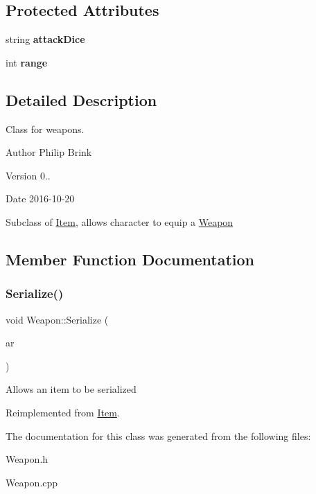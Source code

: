 \subsection*{Protected Attributes}
\begin{DoxyCompactItemize}
\item 
\hypertarget{class_weapon_a034430020bc2fefd021253b49014c334}{}\label{class_weapon_a034430020bc2fefd021253b49014c334} 
string {\bfseries attack\+Dice}
\item 
\hypertarget{class_weapon_a13cc71a89d0cf076f58a040767682478}{}\label{class_weapon_a13cc71a89d0cf076f58a040767682478} 
int {\bfseries range}
\end{DoxyCompactItemize}


\subsection{Detailed Description}
Class for weapons. 

\begin{DoxyAuthor}{Author}
Philip Brink 
\end{DoxyAuthor}
\begin{DoxyVersion}{Version}
0.. 
\end{DoxyVersion}
\begin{DoxyDate}{Date}
2016-\/10-\/20
\end{DoxyDate}
Subclass of \hyperlink{class_item}{Item}, allows character to equip a \hyperlink{class_weapon}{Weapon} 

\subsection{Member Function Documentation}
\hypertarget{class_weapon_a1c30e8f2add0a1aa8558cfbff13ad728}{}\label{class_weapon_a1c30e8f2add0a1aa8558cfbff13ad728} 
\subsubsection{\texorpdfstring{Serialize()}{Serialize()}}
{\footnotesize\ttfamily void Weapon\+::\+Serialize (\begin{DoxyParamCaption}\item[{C\+Archive \&}]{ar }\end{DoxyParamCaption})\hspace{0.3cm}{\ttfamily [virtual]}}

Allows an item to be serialized 

Reimplemented from \hyperlink{class_item_ad1eae21e57fc3ce3252080a4efbfb8e8}{Item}.



The documentation for this class was generated from the following files\+:\begin{DoxyCompactItemize}
\item 
Weapon.\+h\item 
Weapon.\+cpp\end{DoxyCompactItemize}
